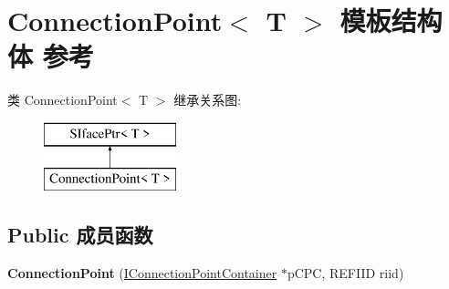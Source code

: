 \hypertarget{struct_connection_point}{}\section{Connection\+Point$<$ T $>$ 模板结构体 参考}
\label{struct_connection_point}
类 Connection\+Point$<$ T $>$ 继承关系图\+:\begin{figure}[H]
\begin{center}
\leavevmode
\includegraphics[height=2.000000cm]{struct_connection_point}
\end{center}
\end{figure}
\subsection*{Public 成员函数}
\begin{DoxyCompactItemize}
\item 
\mbox{\label{struct_connection_point_a2e76c5e65df5d353d0c49f910b49c36f}} 
{\bfseries Connection\+Point} (\hyperlink{interface_i_connection_point_container}{I\+Connection\+Point\+Container} $\ast$p\+C\+PC, R\+E\+F\+I\+ID riid)
\end{DoxyCompactItemize}
